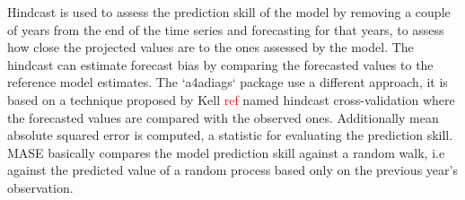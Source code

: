 \documentclass{article}\usepackage[]{graphicx}\usepackage[]{xcolor}
\begin{document}
Hindcast is used to assess the prediction skill of the model by removing a couple of years from the end of the time series and forecasting for that years, to assess how close the projected values are to the ones assessed by the model. The hindcast can estimate forecast bias by comparing the forecasted values to the reference model estimates. The `a4adiags` package use a different approach, it is based on a technique proposed by Kell \textcolor{red}{ref} named hindcast cross-validation where the forecasted values are compared with the observed ones. Additionally mean absolute squared error is computed, a statistic for evaluating the prediction skill. MASE basically compares the model prediction skill against a random walk, i.e against the predicted value of a random process based only on the previous year's observation.
\end{document}
